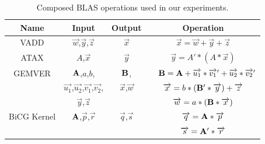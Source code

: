 \documentclass[runningheads]{llncs}
\begin{document}
\begin{table}[htb] 
\caption{Composed BLAS operations used in our experiments.}
\label{tbl:blas-ops}
\small
\centering 
\begin{tabular}{c c c c} 
\hline 
Name & Input & Output & Operation  \\ 
\hline 
VADD & $\overrightarrow{w}$,$\overrightarrow{y}$,$\overrightarrow{z}$ & $\overrightarrow{x}$ &
$\overrightarrow{x} = \overrightarrow{w} + \overrightarrow{y} + \overrightarrow{z}$ \\ [1ex]
ATAX & $A$,$\overrightarrow{x}$ & $\overrightarrow{y}$ & 
$\overrightarrow{y} = A' * (A * \overrightarrow{x})$ \\ [1ex]
GEMVER & ${\bf A}$,$a$,$b$, &  ${\bf B}$,  & ~~${\bf B} = {\bf A} + \overrightarrow{u_1} * \overrightarrow{v_1}' + \overrightarrow{u_2} * \overrightarrow{v_2}'$\\
 & $\overrightarrow{u_1}$,$\overrightarrow{u_2}$,$\overrightarrow{v_1}$,$\overrightarrow{v_2}$, & $\overrightarrow{x}$,$\overrightarrow{w}$ & $\overrightarrow{x} = b * ({\bf B}' * \overrightarrow{y}) + \overrightarrow{z}$\\
& $\overrightarrow{y}$,$\overrightarrow{z}$ &  & $\overrightarrow{w} = a * ({\bf B} * \overrightarrow{x})$\\ [1ex]
BiCG Kernel & ${\bf A}$,$\overrightarrow{p}$,$\overrightarrow{r}$ & $\overrightarrow{q}$,$\overrightarrow{s}$ & $\overrightarrow{q} = {\bf A} * \overrightarrow{p}$ \\ 
& & & $\overrightarrow{s} = {\bf A}' * \overrightarrow{r}$\\
 
\hline 
\end{tabular} 
\vspace{-.1in} 
\end{table} 
\end{document}
